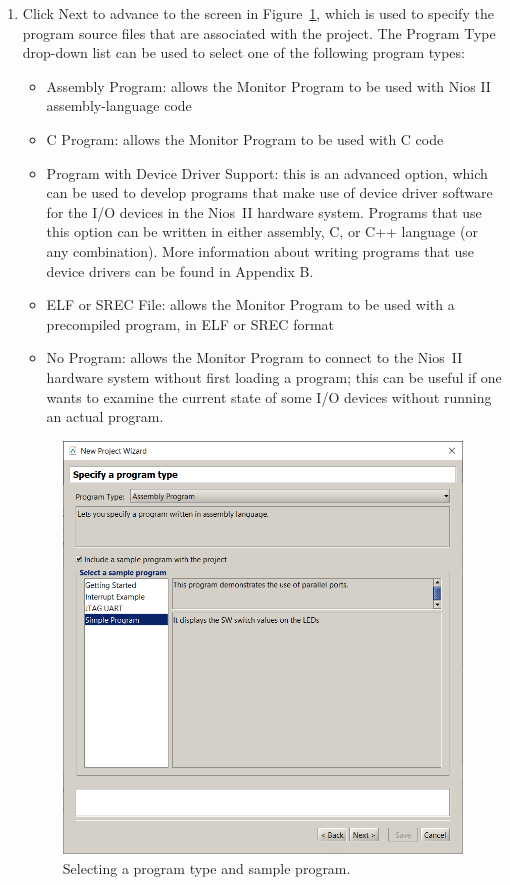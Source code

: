\documentclass[11pt, twoside, pdftex]{article}
\begin{document}
\begin{enumerate}
\item
Click {\sf Next} to advance to the screen in Figure~\ref{fig:7},
which is used to specify the program source files that are associated with the project.
The {\sf Program Type} drop-down list can be used to select one of the following program types:

\begin{itemize}
\item {\sf Assembly Program}: allows the Monitor Program to be
used with Nios II assembly-language code
\item {\sf C Program}: allows the Monitor Program to be used with
C code
\item {\sf Program with Device Driver Support}: this is an
advanced option, which can be used to develop programs that make
use of device driver software for the I/O devices in the Nios~II
hardware system.  Programs that use this option can be written in
either assembly, C, or C++ language (or any combination). 
More information about writing programs that use device drivers
can be found in Appendix B.
\item {\sf ELF or SREC File}: allows the Monitor Program to be
used with a precompiled program, in ELF or SREC format
\item {\sf No Program}: allows the Monitor Program to connect to
the Nios~II hardware system without first loading a program;
this can be useful if one wants to examine the current state of
some I/O devices without running an actual program.
\end{itemize}

\begin{figure}[H]
   \begin{center}
      \includegraphics[scale=0.6]{screenshots/figure7.png}
   \end{center}
   \caption{Selecting a program type and sample program.} 
	 \label{fig:7}
\end{figure}



\end{enumerate}
\end{document}

